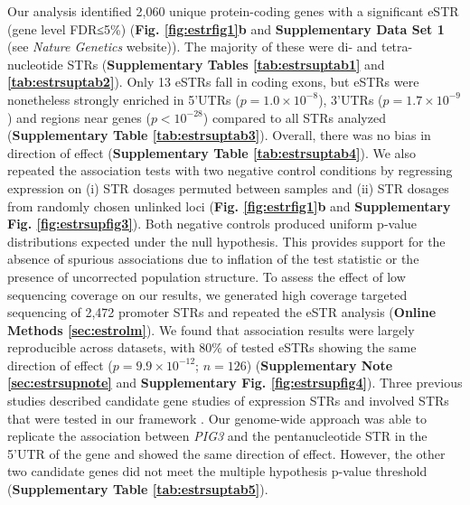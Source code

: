 Our analysis identified 2,060 unique protein-coding genes with a significant eSTR (gene level FDR≤5\%) (\textbf{Fig. \ref{fig:estrfig1}b} and \textbf{Supplementary Data Set 1} (see \emph{Nature Genetics} website)). The majority of these were di- and tetra-nucleotide STRs (\textbf{Supplementary Tables \ref{tab:estrsuptab1}} and \textbf{\ref{tab:estrsuptab2}}). Only 13 eSTRs fall in coding exons, but eSTRs were nonetheless strongly enriched in 5'UTRs ($p=1.0 \times 10^{-8}$), 3'UTRs ($p=1.7\times10^{-9}$) and regions near genes ($p<10^{-28}$) compared to all STRs analyzed (\textbf{Supplementary Table \ref{tab:estrsuptab3}}). Overall, there was no bias in direction of effect (\textbf{Supplementary Table \ref{tab:estrsuptab4}}). We also repeated the association tests with two negative control conditions by regressing expression on (i) STR dosages permuted between samples and (ii) STR dosages from randomly chosen unlinked loci (\textbf{Fig. \ref{fig:estrfig1}b} and \textbf{Supplementary Fig. \ref{fig:estrsupfig3}}). Both negative controls produced uniform p-value distributions expected under the null hypothesis. This provides support for the absence of spurious associations due to inflation of the test statistic or the presence of uncorrected population structure. To assess the effect of low sequencing coverage on our results, we generated high coverage targeted sequencing of 2,472 promoter STRs and repeated the eSTR analysis (\textbf{Online Methods \ref{sec:estrolm}}). We found that association results were largely reproducible across datasets, with 80\% of tested eSTRs showing the same direction of effect ($p=9.9\times 10^{-12}$; $n=126$) (\textbf{Supplementary Note \ref{sec:estrsupnote}} and \textbf{Supplementary Fig. \ref{fig:estrsupfig4}}). Three previous studies described candidate gene studies of expression STRs and involved STRs that were tested in our framework \cite{GebhardtZankerBrandt1999,ShimajiriArimaTanimotoEtAl1999,ContenteDittmerKochEtAl2002}. Our genome-wide approach was able to replicate the association between \emph{PIG3} and the pentanucleotide STR in the 5'UTR of the gene and showed the same direction of effect. However, the other two candidate genes did not meet the multiple hypothesis p-value threshold (\textbf{Supplementary Table \ref{tab:estrsuptab5}}).

